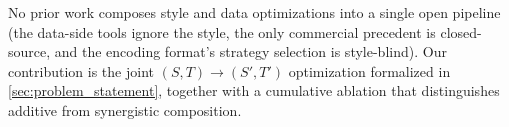 \begin{chaptersummary}
No prior work composes style and data optimizations into a single open pipeline (the data-side tools ignore the style, the only commercial precedent is closed-source, and the encoding format's strategy selection is style-blind).
Our contribution is the joint $(S, T) \to (S', T')$ optimization formalized in \cref{sec:problem_statement}, together with a cumulative ablation that distinguishes additive from synergistic composition.
\end{chaptersummary}

